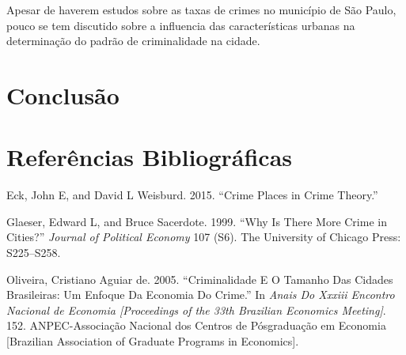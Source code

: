 \documentclass[]{article}
\begin{document}
Apesar de haverem estudos sobre as taxas de crimes no município de São
Paulo, pouco se tem discutido sobre a influencia das características
urbanas na determinação do padrão de criminalidade na cidade.

\section{Conclusão}\label{conclusao}

\section*{Referências Bibliográficas}\label{referencias-bibliograficas}

\hypertarget{refs}{}
\hypertarget{ref-eck2015crime}{}
Eck, John E, and David L Weisburd. 2015. ``Crime Places in Crime
Theory.''

\hypertarget{ref-glaeser1999there}{}
Glaeser, Edward L, and Bruce Sacerdote. 1999. ``Why Is There More Crime
in Cities?'' \emph{Journal of Political Economy} 107 (S6). The
University of Chicago Press: S225--S258.

\hypertarget{ref-de2005criminalidade}{}
Oliveira, Cristiano Aguiar de. 2005. ``Criminalidade E O Tamanho Das
Cidades Brasileiras: Um Enfoque Da Economia Do Crime.'' In \emph{Anais
Do Xxxiii Encontro Nacional de Economia {[}Proceedings of the 33th
Brazilian Economics Meeting{]}}. 152. ANPEC-Associação Nacional dos
Centros de Pósgraduação em Economia {[}Brazilian Association of Graduate
Programs in Economics{]}.
\end{document}
